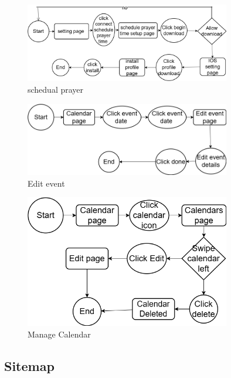 \begin{figure}[H]
    \centering
    \includegraphics[width=0.8\textwidth]{images/schedual prayer.drawio.png}
    \caption{schedual prayer  }
    \label{fig:architecture-realization}
\end{figure}


\begin{figure}[H]
    \centering
    \includegraphics[width=0.8\textwidth]{images/Edit event.drawio.png}
    \caption{Edit event }
    \label{fig:architecture-realization}
\end{figure}


\begin{figure}[H]
    \centering
    \includegraphics[width=0.8\textwidth]{images/Manage calendar.drawio.png}
    \caption{Manage Calendar  }
    \label{fig:architecture-realization}
\end{figure}


\subsection{Sitemap}

